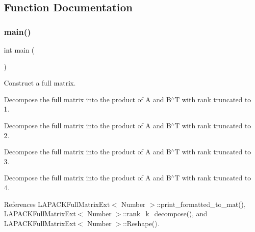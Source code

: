 \subsection{Function Documentation}
\mbox{\label{lapack-matrix-rk-decompose_8cc_ae66f6b31b5ad750f1fe042a706a4e3d4}} 
\subsubsection{\texorpdfstring{main()}{main()}}
{\footnotesize\ttfamily int main (\begin{DoxyParamCaption}{ }\end{DoxyParamCaption})}

Construct a full matrix.

Decompose the full matrix into the product of {\ttfamily A} and {\ttfamily B$^\wedge$T} with rank truncated to 1.

Decompose the full matrix into the product of {\ttfamily A} and {\ttfamily B$^\wedge$T} with rank truncated to 2.

Decompose the full matrix into the product of {\ttfamily A} and {\ttfamily B$^\wedge$T} with rank truncated to 3.

Decompose the full matrix into the product of {\ttfamily A} and {\ttfamily B$^\wedge$T} with rank truncated to 4.

References L\+A\+P\+A\+C\+K\+Full\+Matrix\+Ext$<$ Number $>$\+::print\+\_\+formatted\+\_\+to\+\_\+mat(), L\+A\+P\+A\+C\+K\+Full\+Matrix\+Ext$<$ Number $>$\+::rank\+\_\+k\+\_\+decompose(), and L\+A\+P\+A\+C\+K\+Full\+Matrix\+Ext$<$ Number $>$\+::\+Reshape().

